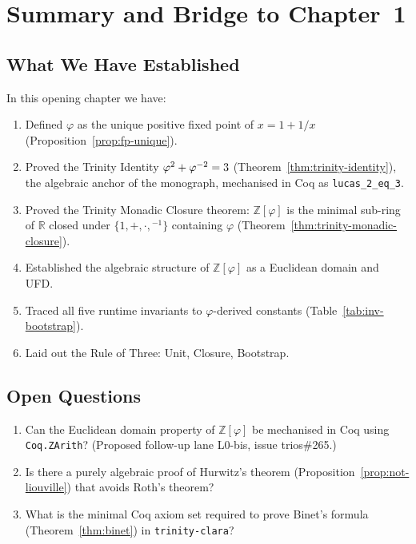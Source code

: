 
\section{Summary and Bridge to Chapter~1}
\label{sec:monad-summary}

\subsection{What We Have Established}

In this opening chapter we have:
\begin{enumerate}
  \item Defined $\varphi$ as the unique positive fixed point of
    $x = 1 + 1/x$ (Proposition~\ref{prop:fp-unique}).
  \item Proved the Trinity Identity $\varphi^{2} + \varphi^{-2} = 3$
    (Theorem~\ref{thm:trinity-identity}), the algebraic anchor of the
    monograph, mechanised in Coq as \texttt{lucas\_2\_eq\_3}.
  \item Proved the Trinity Monadic Closure theorem: $\mathbb{Z}[\varphi]$
    is the minimal sub-ring of $\mathbb{R}$ closed under $\{1,+,\cdot,{}^{-1}\}$
    containing $\varphi$ (Theorem~\ref{thm:trinity-monadic-closure}).
  \item Established the algebraic structure of $\mathbb{Z}[\varphi]$
    as a Euclidean domain and UFD.
  \item Traced all five runtime invariants to $\varphi$-derived constants
    (Table~\ref{tab:inv-bootstrap}).
  \item Laid out the Rule of Three: Unit, Closure, Bootstrap.
\end{enumerate}

\subsection{Open Questions}

\begin{enumerate}
  \item Can the Euclidean domain property of $\mathbb{Z}[\varphi]$
    be mechanised in Coq using \texttt{Coq.ZArith}?
    (Proposed follow-up lane L0-bis, issue trios\#265.)
  \item Is there a purely algebraic proof of Hurwitz's theorem
    (Proposition~\ref{prop:not-liouville}) that avoids Roth's theorem?
  \item What is the minimal Coq axiom set required to prove Binet's
    formula (Theorem~\ref{thm:binet}) in \texttt{trinity-clara}?
\end{enumerate}

